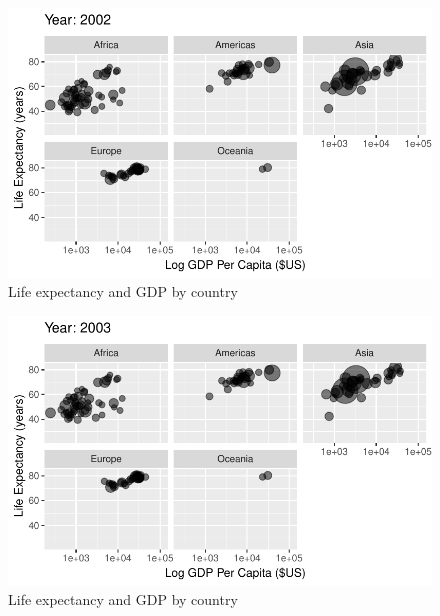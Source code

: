 \documentclass[
  letterpaper,
  DIV=11,
  numbers=noendperiod]{scrreport}
\theoremstyle{definition}
\theoremstyle{remark}
\begin{document}
\begin{figure}

{\centering \includegraphics{index_files/figure-pdf/fig-anim-lifegdp-91.pdf}

}

\caption{\label{fig-anim-lifegdp-91}Life expectancy and GDP by country}

\end{figure}

\begin{figure}

{\centering \includegraphics{index_files/figure-pdf/fig-anim-lifegdp-92.pdf}

}

\caption{\label{fig-anim-lifegdp-92}Life expectancy and GDP by country}

\end{figure}
\end{document}
